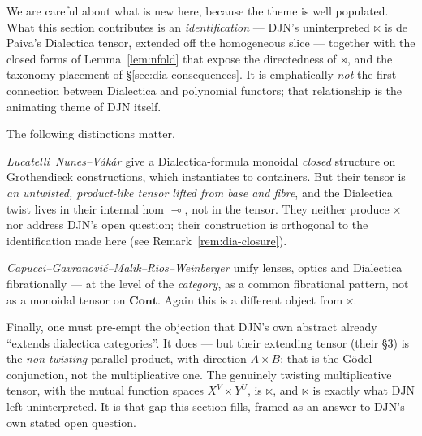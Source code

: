 \documentclass[11pt,a4paper]{article}
\newcommand{\Cont}{\mathbf{Cont}}
\theoremstyle{plain}
\theoremstyle{definition}
\theoremstyle{remark}
\begin{document}
We are careful about what is new here, because the theme is well populated. What
this section contributes is an \emph{identification} --- DJN's uninterpreted
$\ltimes$ is de Paiva's Dialectica tensor, extended off the homogeneous slice ---
together with the closed forms of Lemma~\ref{lem:nfold} that expose the
directedness of $\rtimes$, and the taxonomy placement of
§\ref{sec:dia-consequences}. It is emphatically \emph{not} the first connection
between Dialectica and polynomial functors; that relationship is the animating
theme of DJN \cite{DJN23} itself.

The following distinctions matter.

\emph{Lucatelli~Nunes--Vákár \cite{lnv2405}} give a Dialectica-formula monoidal
\emph{closed} structure on Grothendieck constructions, which instantiates to
containers. But their tensor is \emph{an untwisted, product-like tensor lifted
from base and fibre}, and the Dialectica
twist lives in their internal hom $\multimap$, not in the tensor. They neither
produce $\ltimes$ nor address DJN's open question; their construction is
orthogonal to the identification made here (see Remark~\ref{rem:dia-closure}).

\emph{Capucci--Gavranović--Malik--Rios--Weinberger \cite{capucci2024}} unify
lenses, optics and Dialectica fibrationally --- at the level of the
\emph{category}, as a common fibrational pattern, not as a monoidal tensor on
$\Cont$. Again this is a different object from $\ltimes$.

Finally, one must pre-empt the objection that DJN's own abstract already
``extends dialectica categories''. It does --- but their extending tensor (their
\S3) is the \emph{non-twisting} parallel product, with direction $A\times B$;
that is the Gödel conjunction, not the multiplicative one. The genuinely
twisting multiplicative tensor, with the mutual function spaces $X^{V}\times
Y^{U}$, is $\ltimes$, and $\ltimes$ is exactly what DJN left uninterpreted. It is
that gap this section fills, framed as an answer to DJN's own stated open
question.
\end{document}
